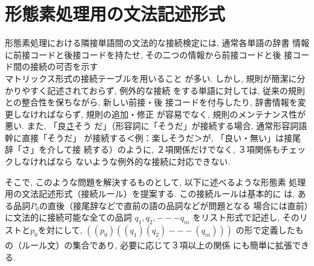 \section{形態素処理用の文法記述形式}

 形態素処理における隣接単語間の文法的な接続検定には, 通常各単語の辞書
情報に前接コードと後接コードを持たせ, \hspace*{0.4mm}その二つの情報から前接コードと後
接コード間の接続の可否を示す\\マトリックス形式の接続テーブルを用いること
が多い. しかし, 規則が簡潔に分かりやすく記述されておらず, 例外的な接続
をする単語に対しては, 従来の規則との整合性を保ちながら, 新しい前接・後
接コードを付与したり, 辞書情報を変更しなければならず, 規則の追加・修正
が容易でなく, 規則のメンテナンス性が悪い. また, 「良\hspace*{-0.2mm}\underline{さ}\hspace*{-0.1mm}そう
だ」（形容詞に「そうだ」が接続する場合, 通常形容詞語幹に直接「そうだ」
が接続する＜例：\hspace*{-0.2mm}楽しそうだ＞が, 「良い・無い」は接尾\\辞「さ」を介して接
続する）のように, ２項関係だけでなく, ３項関係もチェックしなければなら
ないような例外的な接続に対応できない.

 そこで, このような問題を解決するものとして, 以下に述べるような形態素
処理用の文法記述形式（接続ルール）を提案する. この接続ルールは基本的に
は, ある品詞\(P_{0}\)の直後（接尾辞などで直前の語の品詞などが問題となる
場合には直前）に文法的に接続可能な全ての品詞 \(q_{1},q_{2},---q_{m}\)
をリスト形式で記述し, 
そのリストと\(p_{0}\)を対にして,
\(\underline{((p_{0})((q_{1})(q_{2})---(q_{m})))}\)
の形で定義したもの（ルール文）の集合であり, 必要に応じて３項以上の関係
にも簡単に拡張できる.


